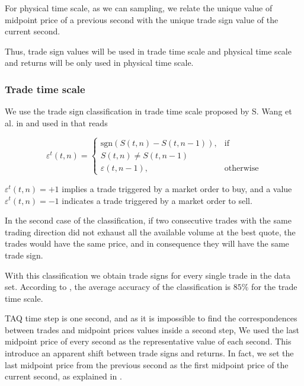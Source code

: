 For physical time scale, as we can sampling, we relate the unique value of
midpoint price of a previous second with the unique trade sign value of the
current second.

Thus, trade sign values will be used in trade time scale and physical time
scale and returns will be only used in physical time scale.

\subsubsection{Trade time scale}\label{subsubsec:trade_time}

We use the trade sign classification in trade time scale proposed by S. Wang et
al. in \cite{Wang_2016_cross} and used in
\cite{Wang_2017,Wang_2018_copulas,Wang_2016_avg} that reads

\begin{equation}\label{eq:trade_signs_trade}
    \varepsilon^{t}\left(t,n\right)=\left\{
    \begin{array}{cc}
    \text{sgn}\left(S\left(t,n\right)-S\left(t,n-1\right)\right),
    & \text{if }\\ S\left(t,n\right) \ne S\left(t,n-1\right)\\
    \varepsilon\left(t,n-1\right),
    & \text{otherwise}
    \end{array}\right.
\end{equation}

$\varepsilon^{t}\left( t,n \right) = +1$ implies a trade triggered by a market
order to buy, and a value $\varepsilon^{t}\left( t,n \right) = -1$ indicates a
trade triggered by a market order to sell.

In the second case of the classification, if two consecutive trades with the
same trading direction did not exhaust all the available volume at the best
quote, the trades would have the same price, and in consequence they will have
the same trade sign.

With this classification we obtain trade signs for every single trade in the
data set. According to \cite{Wang_2016_cross}, the average accuracy of the
classification is $85\%$ for the trade time scale.

TAQ time step is one second, and as it is impossible to find the
correspondences between trades and midpoint prices values inside a second step,
We used the last midpoint price of every second as the representative value of
each second. This introduce an apparent shift between trade signs and returns.
In fact, we set the last midpoint price from the previous second as the first
midpoint price of the current second, as explained in \cite{Wang_2016_cross}.


